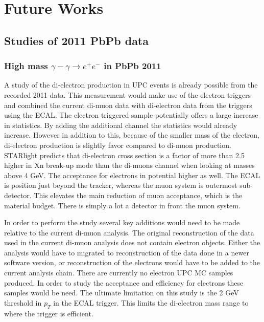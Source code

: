 \chapter{Future Works}	
  \section{Studies of 2011 PbPb data}

    \subsection{High mass $\gamma-\gamma \rightarrow e^{+} e^{-}$  in PbPb 2011}
      A study of the di-electron production in UPC events is already possible 
	from the recorded 2011 data. 
      This measurement would make use of the electron triggers and combined the 
	current di-muon data with di-electron data from the triggers using the
	ECAL. 
      The electron triggered sample potentially offers a large increase in 
	statistics. 
      By adding the additional channel the statistics would already increase.
      However in addition to this, because of the smaller mass of the electron,
	di-electron production is slightly favor compared to di-muon 
	production.
      STARlight predicts that di-electron cross section is a factor of more than 
	2.5 higher in Xn break-up mode than the di-muons channel when looking 
	at masses above 4 GeV.
      The acceptance for electrons in potential higher as well. 
      The ECAL is position just beyond the tracker, whereas the muon system is 
	outermost sub-detector. 
      This elevates the main reduction of muon acceptance, which is the material
	budget. 
      There is simply a lot a detector in front the muon system.

      In order to perform the study several key additions would need to be made
	relative to the current di-muon analysis. 
      The original reconstruction of the data used in the current di-muon 
	analysis does not contain electron objects. 
      Either the analysis would have to migrated to reconstruction of the data
	done in a newer software version, or reconstruction of the electrons 
	would have to be added to the current analysis chain. 
      There are currently no electron UPC MC samples produced. 
      In order to study the acceptance and efficiency for electrons these samples
	would be need. 
      The ultimate limitation on this study is the 2 GeV threshold in $p_{T}$ in
	the ECAL trigger. 
      This limits the di-electron mass range to where the trigger is efficient. 

